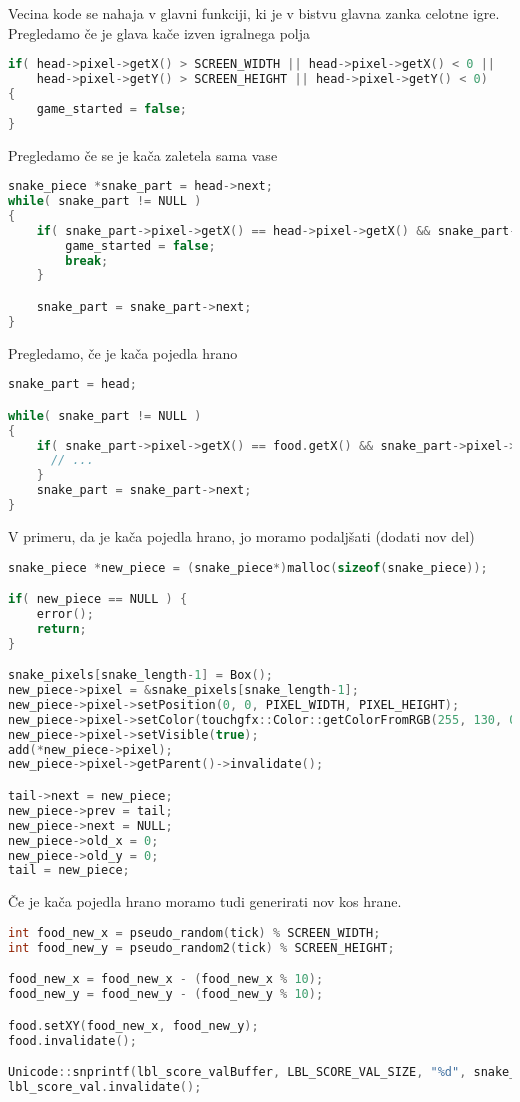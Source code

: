 \documentclass{article}
\begin{document}
\noindent
Vecina kode se nahaja v glavni funkciji, ki je v bistvu glavna
zanka celotne igre. \\

\noindent
Pregledamo \v{c}e je glava ka\v{c}e izven igralnega polja
\begin{lstlisting}[language=c++]
if( head->pixel->getX() > SCREEN_WIDTH || head->pixel->getX() < 0 ||
    head->pixel->getY() > SCREEN_HEIGHT || head->pixel->getY() < 0)
{
    game_started = false;
}
\end{lstlisting}

\noindent
Pregledamo \v{c}e se je ka\v{c}a zaletela sama vase
\begin{lstlisting}[language=c++]
snake_piece *snake_part = head->next;
while( snake_part != NULL )
{
    if( snake_part->pixel->getX() == head->pixel->getX() && snake_part->pixel->getY() == head->pixel->getY() ) {
        game_started = false;
        break;
    }

    snake_part = snake_part->next;
}
\end{lstlisting}

\noindent
Pregledamo, \v{c}e je ka\v{c}a pojedla hrano
\begin{lstlisting}[language=c++]
snake_part = head;

while( snake_part != NULL )
{
    if( snake_part->pixel->getX() == food.getX() && snake_part->pixel->getY() == food.getY() ) {
      // ...
    }
    snake_part = snake_part->next;
}
\end{lstlisting}

\noindent
V primeru, da je ka\v{c}a pojedla hrano, jo moramo podalj\v{s}ati (dodati
nov del)
\begin{lstlisting}[language=c++]
snake_piece *new_piece = (snake_piece*)malloc(sizeof(snake_piece));

if( new_piece == NULL ) {
    error();
    return;
}

snake_pixels[snake_length-1] = Box();
new_piece->pixel = &snake_pixels[snake_length-1];
new_piece->pixel->setPosition(0, 0, PIXEL_WIDTH, PIXEL_HEIGHT);
new_piece->pixel->setColor(touchgfx::Color::getColorFromRGB(255, 130, 0));
new_piece->pixel->setVisible(true);
add(*new_piece->pixel);
new_piece->pixel->getParent()->invalidate();

tail->next = new_piece;
new_piece->prev = tail;
new_piece->next = NULL;
new_piece->old_x = 0;
new_piece->old_y = 0;
tail = new_piece;
\end{lstlisting}

\noindent
\v{C}e je ka\v{c}a pojedla hrano moramo tudi generirati nov kos hrane.
\begin{lstlisting}[language=c++]
int food_new_x = pseudo_random(tick) % SCREEN_WIDTH;
int food_new_y = pseudo_random2(tick) % SCREEN_HEIGHT;

food_new_x = food_new_x - (food_new_x % 10);
food_new_y = food_new_y - (food_new_y % 10);

food.setXY(food_new_x, food_new_y);
food.invalidate();

Unicode::snprintf(lbl_score_valBuffer, LBL_SCORE_VAL_SIZE, "%d", snake_length);
lbl_score_val.invalidate();
\end{lstlisting}
\end{document}
